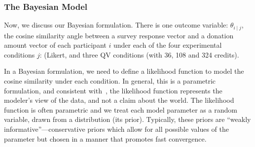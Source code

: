 \subsubsection{The Bayesian Model}
\label{exp1:The Bayesian Model}



Now, we discuss our Bayesian formulation. There is one outcome variable: $\theta_{i \mid j}$, the cosine similarity angle between a survey response vector and  a donation amount vector of each participant $i$  under each of the four experimental conditions $j$: (Likert, and three QV conditions (with 36, 108 and 324 credits). 

In a Bayesian formulation, we need to define a likelihood function to model the cosine similarity under each condition. In general, this is a parametric formulation, and consistent with~\textcite{McElreath2015}, the likelihood function represents the modeler's view of the data, and not a claim about the world. The likelihood function is often parametric and we treat each model parameter as a random variable, drawn from a distribution (its prior). Typically, these priors are ``weakly informative''---conservative priors which allow for all possible values of the parameter but chosen in a manner that promotes fast convergence.




